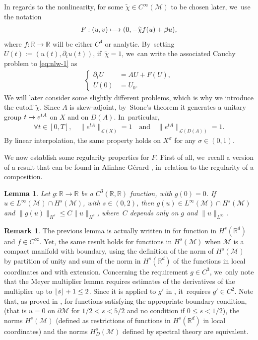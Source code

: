 \documentclass[10pt]{amsart}
\newcommand{\quand}{\quad\text{and}\quad}
\newcommand\mto{\mathchoice{\longmapsto}{\mapsto}{\mapsto}{\mapsto}}
\DeclarePairedDelimiter\floor{\lfloor}{\rfloor}
\newtheorem{lemma}[theorem]{Lemma}
\theoremstyle{definition}
\newtheorem{remark}[theorem]{Remark}
\let\mc\mathcal
\newcommand{\M}{\mc{M}}
\newcommand{\R}{\mathbb{R}}
\providecommand{\norm}[1]{\lVert#1\rVert}
\begin{document}
In regards to the nonlinearity, for some $\widetilde{\chi}\in C^{\infty}(\M)$ to be chosen later, we~use the notation\vspace*{-3pt}
\begin{align}
\label{defFwave}
F: (u, v)\mto (0, -\widetilde{\chi} f(u)+\beta u),
\end{align}
where $f: \R \to \R$ will be either $C^4$ or analytic. By~setting $U(t):=(u(t), \partial_t u(t))$, if~$\widetilde{\chi}=1$, we~can write the associated Cauchy problem to \eqref{eq:nlw-1} as\vspace*{-3pt}
\begin{align}\label{eq:nlw-1-cauchy}
\left\{\begin{array}{rl}
\partial_t U&=AU+F(U), \\[3pt]
U(0)&=U_0.
\end{array}\right.
\end{align}
We will later consider some slightly different problems, which is why we introduce the cutoff $\widetilde{\chi}$. Since $A$ is skew-adjoint, by~Stone's theorem it generates a unitary group $t\mto e^{tA}$ on $X$ and on $D(A)$. In~particular,\vspace*{-3pt}
\begin{align*}
\forall t\in [0, T],\quad \norm{e^{tA}}_{\mc{L}(X)}= 1\quand\norm{e^{tA}}_{\mc{L}(D(A))}=1.
\end{align*}
By linear interpolation, the same property holds on $X^\sigma$ for any $\sigma\in (0, 1)$.

We now establish some regularity properties for $F$. First of all, we~recall a version of a result that can be found in Alinhac-Gérard \cite[Prop.\,2.2]{AG91}, in~relation to the regularity of a composition.
\begin{lemma}\label{lem:comp-reg}
Let $g: \R\to \R$ be a $C^3(\R, \R)$ function, with $g(0)=0$. If $u\in L^\infty(\M)\cap H^s(\M)$, with $s\in (0, 2)$, then $g(u)\in L^\infty(\M)\cap H^s(\M)$ and $\norm{g(u)}_{H^s}\leq C\norm{u}_{H^s}$, where~$C$ depends only on $g$ and $\norm{u}_{L^{\infty}}$.
\end{lemma}

\begin{remark}
The previous lemma is actually written in \cite{AG91} for function in $H^s(\R^d)$ and $f\in C^{\infty}$. Yet, the same result holds for functions in $H^s(\M)$ when $\M$ is a compact manifold with boundary, using the definition of the norm of $H^s(\M)$ by partition of unity and sum of the norm in $H^s(\R^d)$ of the functions in local coordinates and with extension. Concerning the requirement $g\in C^3$, we~only note that the Meyer multiplier lemma \cite[Lem.\,2.2.]{AG91} requires estimates of the derivatives of the multiplier up to $\floor{s}+1\leq 2$. Since it is applied to $g'$ in \cite[Prop.\,2.2]{AG91}, it~requires $g'\in C^2$. Note that, as proved in \cite{G:67}, for functions satisfying the appropriate boundary condition, (that is $u=0$ on $\partial \M$ for $1/2<s<5/2$ and no condition if $0\leq s<1/2$), the norms $H^s(\M)$ (defined as restrictions of functions in $H^s(\R^d)$ in local coordinates) and the norms $H^s_D(\M)$ defined by spectral theory are equivalent.
\end{remark}
\end{document}
